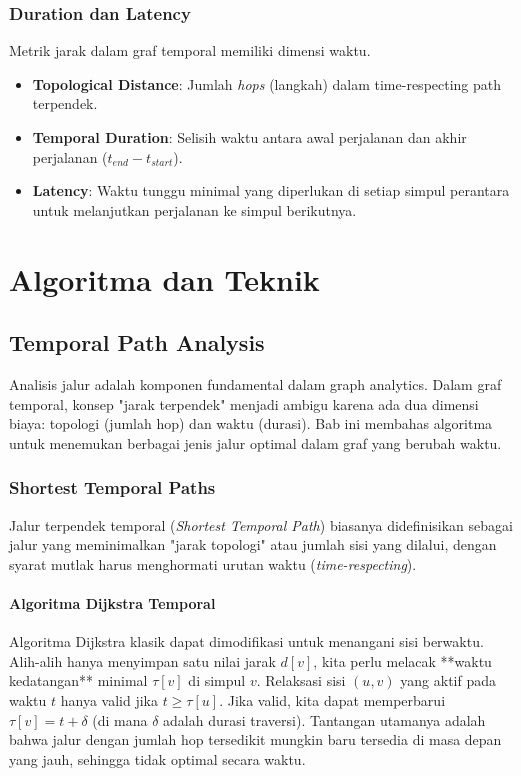 \documentclass[12pt,a4paper]{book}
\begin{document}
\section{Duration dan Latency}
Metrik jarak dalam graf temporal memiliki dimensi waktu.
\begin{itemize}
    \item \textbf{Topological Distance}: Jumlah \textit{hops} (langkah) dalam time-respecting path terpendek.
    \item \textbf{Temporal Duration}: Selisih waktu antara awal perjalanan dan akhir perjalanan ($t_{end} - t_{start}$).
    \item \textbf{Latency}: Waktu tunggu minimal yang diperlukan di setiap simpul perantara untuk melanjutkan perjalanan ke simpul berikutnya.
\end{itemize}

\part{Algoritma dan Teknik}

\chapter{Temporal Path Analysis}
Analisis jalur adalah komponen fundamental dalam graph analytics. Dalam graf temporal, konsep "jarak terpendek" menjadi ambigu karena ada dua dimensi biaya: topologi (jumlah hop) dan waktu (durasi). Bab ini membahas algoritma untuk menemukan berbagai jenis jalur optimal dalam graf yang berubah waktu.

\section{Shortest Temporal Paths}
Jalur terpendek temporal (\textit{Shortest Temporal Path}) biasanya didefinisikan sebagai jalur yang meminimalkan "jarak topologi" atau jumlah sisi yang dilalui, dengan syarat mutlak harus menghormati urutan waktu (\textit{time-respecting}).

\subsection{Algoritma Dijkstra Temporal}
Algoritma Dijkstra klasik dapat dimodifikasi untuk menangani sisi berwaktu. Alih-alih hanya menyimpan satu nilai jarak $d[v]$, kita perlu melacak **waktu kedatangan** minimal $\tau[v]$ di simpul $v$.
Relaksasi sisi $(u, v)$ yang aktif pada waktu $t$ hanya valid jika $t \ge \tau[u]$. Jika valid, kita dapat memperbarui $\tau[v] = t + \delta$ (di mana $\delta$ adalah durasi traversi).
Tantangan utamanya adalah bahwa jalur dengan jumlah hop tersedikit mungkin baru tersedia di masa depan yang jauh, sehingga tidak optimal secara waktu.
\end{document}
